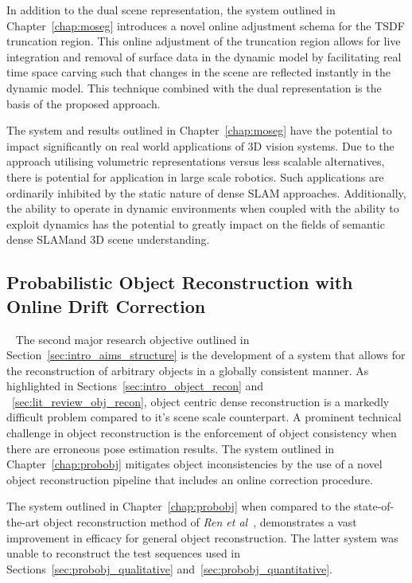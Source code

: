 In addition to the dual scene representation, the system outlined in Chapter~\ref{chap:moseg} 
introduces a novel online adjustment schema for the TSDF truncation region. This online adjustment 
of the truncation region allows for live integration and removal of surface data in the dynamic 
model by facilitating real time space carving such that changes in the scene are reflected 
instantly in the dynamic model. This technique combined with the dual representation is the 
basis of the proposed approach.

The system and results outlined in Chapter~\ref{chap:moseg} have the potential to impact 
significantly on real world applications of 3D vision systems. Due to the approach utilising 
volumetric representations versus less scalable alternatives, there is potential for application 
in large scale robotics. Such applications are ordinarily inhibited by the static nature of 
dense SLAM approaches. Additionally, the ability to operate in dynamic environments when coupled 
with the ability to exploit dynamics has the potential to greatly impact on the fields of semantic 
dense SLAM\@ and 3D scene understanding.

\subsection{Probabilistic Object Reconstruction with Online Drift Correction}
~\label{subsec:discussion_probobj}
The second major research objective outlined in Section~\ref{sec:intro_aims_structure} is the 
development of a system that allows for the reconstruction of arbitrary objects in a globally 
consistent manner. As highlighted in Sections~\ref{sec:intro_object_recon} and
~\ref{sec:lit_review_obj_recon}, object centric dense reconstruction is a markedly difficult 
problem compared to it's scene scale counterpart. A prominent technical challenge in object 
reconstruction is the enforcement of object consistency when there are erroneous pose estimation 
results. The system outlined in Chapter~\ref{chap:probobj} mitigates object inconsistencies by 
the use of a novel object reconstruction pipeline that includes an online correction procedure.

The system outlined in Chapter~\ref{chap:probobj} when compared to the state-of-the-art object 
reconstruction method of \textit{Ren et al}~\cite{Ren2013}, demonstrates a vast improvement in 
efficacy for general object reconstruction. The latter system was unable to reconstruct the test 
sequences used in Sections~\ref{sec:probobj_qualitative} and~\ref{sec:probobj_quantitative}. 

